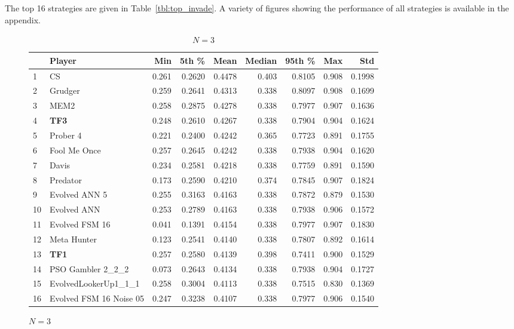 \documentclass[10pt,letterpaper]{article}
\begin{document}
The top 16 strategies are given in Table~\ref{tbl:top_invade}. A variety of
figures showing the performance of all strategies is available in the
appendix.

\begin{table}[!hbtp]
    \centering
    \tiny
    \begin{subfigure}[t]{\columnwidth}
        \centering
            \begin{tabular}{llrrrrrrr}
            \toprule
            {} &                   Player &    Min &   5th \% &    Mean &  Median &  95th \% &    Max &     Std \\
            \midrule
            1  &                       CS &  0.261 &  0.2620 &  0.4478 &   0.403 &  0.8105 &  0.908 &  0.1998 \\
            2  &                  Grudger &  0.259 &  0.2641 &  0.4313 &   0.338 &  0.8097 &  0.908 &  0.1699 \\
            3  &                     MEM2 &  0.258 &  0.2875 &  0.4278 &   0.338 &  0.7977 &  0.907 &  0.1636 \\
            4  &                      \textbf{TF3} &  0.248 &  0.2610 &  0.4267 &   0.338 &  0.7904 &  0.904 &  0.1624 \\
            5  &                 Prober 4 &  0.221 &  0.2400 &  0.4242 &   0.365 &  0.7723 &  0.891 &  0.1755 \\
            6  &             Fool Me Once &  0.257 &  0.2645 &  0.4242 &   0.338 &  0.7938 &  0.904 &  0.1620 \\
            7  &                    Davis &  0.234 &  0.2581 &  0.4218 &   0.338 &  0.7759 &  0.891 &  0.1590 \\
            8  &                 Predator &  0.173 &  0.2590 &  0.4210 &   0.374 &  0.7845 &  0.907 &  0.1824 \\
            9  &            Evolved ANN 5 &  0.255 &  0.3163 &  0.4163 &   0.338 &  0.7872 &  0.879 &  0.1530 \\
            10 &              Evolved ANN &  0.253 &  0.2789 &  0.4163 &   0.338 &  0.7938 &  0.906 &  0.1572 \\
            11 &           Evolved FSM 16 &  0.041 &  0.1391 &  0.4154 &   0.338 &  0.7977 &  0.907 &  0.1830 \\
            12 &              Meta Hunter &  0.123 &  0.2541 &  0.4140 &   0.338 &  0.7807 &  0.892 &  0.1614 \\
            13 &                      \textbf{TF1} &  0.257 &  0.2580 &  0.4139 &   0.398 &  0.7411 &  0.900 &  0.1529 \\
            14 &        PSO Gambler 2\_2\_2 &  0.073 &  0.2643 &  0.4134 &   0.338 &  0.7938 &  0.904 &  0.1727 \\
            15 &     EvolvedLookerUp1\_1\_1 &  0.258 &  0.3004 &  0.4113 &   0.338 &  0.7515 &  0.830 &  0.1369 \\
            16 &  Evolved FSM 16 Noise 05 &  0.247 &  0.3238 &  0.4107 &   0.338 &  0.7977 &  0.906 &  0.1540 \\
            \bottomrule
            \end{tabular}
        \caption{\(N=3\)}
    \end{subfigure}%


\end{table}
\end{document}
